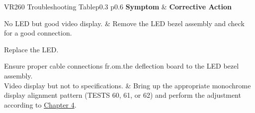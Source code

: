 \begin{tblcont}{VR260 Troubleshooting Table}{p{0.3\textwidth} p{0.6\textwidth}}
\textbf{Symptom} & \textbf{Corrective Action} \\
\hline

No LED but good video display.	&
	Remove the LED bezel assembly and check for a good connection.

	\vspace*{0.8em}
	Replace the LED.

	\vspace*{0.8em}
	Ensure proper cable connections fr.om.the deflection board
	to the LED bezel assembly.
\\
Video display but not to specifications.	&
	Bring up the appropriate monochrome display alignment
	pattern (TESTS 60, 61, or 62) and perform the adjustment
	according to \hyperlink{chapter.4}{Chapter 4}.
\\
\end{tblcont}
